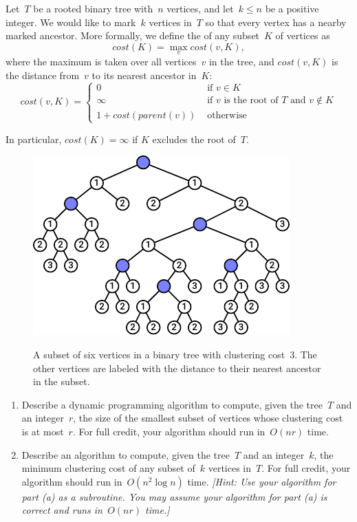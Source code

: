\documentclass[11pt]{article}
\begin{document}
\begin{problems}
\item
  Let~\(T\) be a rooted binary tree with~\(n\) vertices, and let~\(k \leq n\) be a positive integer.
  We would like to mark~\(k\) vertices in~\(T\) so that every vertex has a nearby marked ancestor.
  More formally, we define the  of any subset~\(K\) of vertices as
  \[ cost(K) = \max_{v} cost(v, K), \]
  where the maximum is taken over all vertices~\(v\) in the tree, and \(cost(v, K)\) is the distance
  from~\(v\) to its nearest ancestor in~\(K\):
  \[ cost(v, K) =
    \begin{cases}
      0 &\text{ if \(v \in K\)}\\
      \infty &\text{ if \(v\) is the root of \(T\) and \(v \notin K\)}\\
      1 + cost(parent(v)) &\text{ otherwise}
    \end{cases}
  \]

  In particular, \(cost(K) = \infty\) if \(K\) excludes the root of~\(T\).
  \begin{figure}[h]
    \centering
    \includegraphics{figs/clustering_cost}
    \label{fig:clustering_cost}
    \caption{A subset of six vertices in a binary tree with clustering cost~\(3\).
    The other vertices are labeled with the distance to their nearest ancestor in the subset.}
  \end{figure}

  \begin{enumerate}
    \item
      Describe a dynamic programming algorithm to compute, given the tree~\(T\) and an
      integer~\(r\), the size of the smallest subset of vertices whose clustering cost is at
      most~\(r\).
      For full credit, your algorithm should run in~\(O(nr)\) time.

    \item
      Describe an algorithm to compute, given the tree~\(T\) and an integer~\(k\), the minimum
      clustering cost of any subset of~\(k\) vertices in~\(T\).
      For full credit, your algorithm should run in~\(O(n^2 \log n)\) time.
      \emph{[Hint: Use your algorithm for part (a) as a subroutine.
      You may assume your algorithm for part (a) is correct and runs in~\(O(nr)\) time.]}
  \end{enumerate}


\end{problems}
\end{document}
